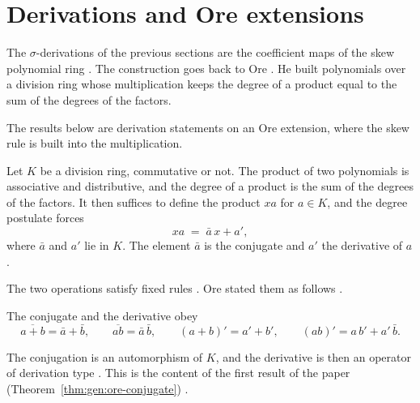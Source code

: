 \section{Derivations and Ore extensions}\label{sec:generalized-twisted:ore-extensions}

The $\sigma$-derivations of the previous sections are the coefficient maps of
the skew polynomial ring \cite[p.~2838]{Chuang2017Auto}. The construction goes
back to Ore \cite[p.~480]{Ore1933}. He built polynomials over a division ring
whose multiplication keeps the degree of a product equal to the sum of the
degrees of the factors.

The results below are derivation statements on an Ore extension, where the
skew rule is built into the multiplication.

\begin{definition}\label{def:gen:ore-product}
Let $K$ be a division ring, commutative or not. The product of two polynomials
is associative and distributive, and the degree of a product is the sum of the
degrees of the factors. It then suffices to define the product $xa$ for
$a\in K$, and the degree postulate forces
\begin{equation*}
x a \;=\; \bar{a}\, x + a',
\end{equation*}
where $\bar a$ and $a'$ lie in $K$. The element $\bar a$ is the conjugate and
$a'$ the derivative of $a$.
\end{definition}

The two operations satisfy fixed rules \cite[p.~482]{Ore1933}. Ore stated them
as follows \cite[(4)--(5), p.~482]{Ore1933}.

\begin{remark}\label{rem:gen:ore-rules}
The conjugate and the derivative obey
\begin{equation*}
\overline{a+b}=\bar a+\bar b,\qquad \overline{ab}=\bar a\,\bar b,
\qquad (a+b)'=a'+b',\qquad (ab)'=a\,b'+a'\,\bar b .
\end{equation*}
\end{remark}

The conjugation is an automorphism of $K$, and the derivative is then an
operator of derivation type \cite[p.~482]{Ore1933}. This is the content of the
first result of the paper (Theorem~\ref{thm:gen:ore-conjugate})
\cite[Theorem~1, p.~482]{Ore1933}.

